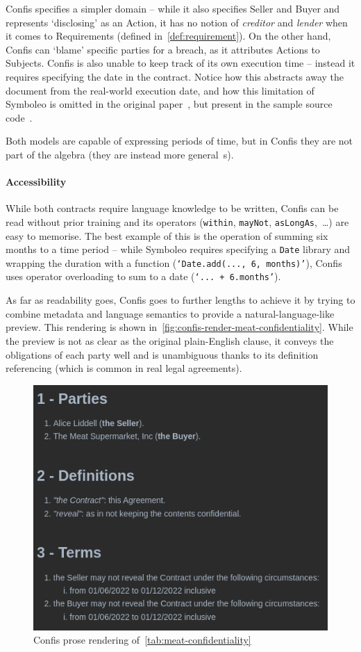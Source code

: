 Confis specifies a simpler domain -- while it also specifies Seller and Buyer and represents `disclosing' as an Action, it has no notion of \emph{creditor} and \emph{lender} when it comes to Requirements (defined in~\autoref{def:requirement}).
On the other hand, Confis can `blame' specific parties for a breach, as it attributes Actions to Subjects.
Confis is also unable to keep track of its own execution time -- instead it requires specifying the date in the contract.
Notice how this abstracts away the document from the real-world execution date, and how this limitation of Symboleo is omitted in the original paper~\cite{symboleo2020}, but present in the sample source code~\cite{symboleoMeat}.

Both models are capable of expressing periods of time, but in Confis they are not part of the algebra (they are instead more general~s).

\paragraph{Accessibility}

While both contracts require language knowledge to be written, Confis can be read without prior training and its operators (\texttt{within}, \texttt{mayNot}, \texttt{asLongAs},~\dots) are easy to memorise.
The best example of this is the operation of summing six months to a time period -- while Symboleo requires specifying a \texttt{Date} library and wrapping the duration with a function (\texttt{`Date.add(..., 6, months)'}), Confis uses operator overloading to sum to a date (\texttt{`... + 6.months'}).

As far as readability goes, Confis goes to further lengths to achieve it by trying to combine metadata and language semantics to provide a natural-language-like preview.
This rendering is shown in~\autoref{fig:confis-render-meat-confidentiality}.
While the preview is not as clear as the original plain-English clause, it conveys the obligations of each party well and is unambiguous thanks to its definition referencing (which is common in real legal agreements).

\begin{figure}[H]
    \centering
    \includegraphics[width=0.67\columnwidth]{figures/confis.meat.prose}
    \caption{Confis prose rendering of~\autoref{tab:meat-confidentiality}}
    \label{fig:confis-render-meat-confidentiality}
\end{figure}

